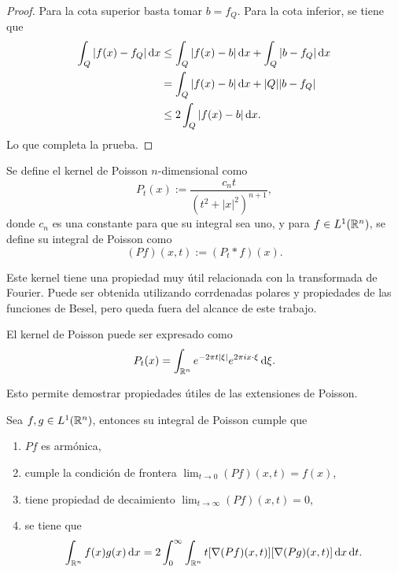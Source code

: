 \begin{proof}
	Para la cota superior basta tomar $b=f_Q$. Para la cota inferior, se tiene que
	\begin{align*}
		\int_Q |f(x) - f_Q|\mathop{}\!\mathrm{d} x & \leq \int_Q |f(x) - b| \mathop{}\!\mathrm{d} x + \int_Q |b- f_Q|\mathop{}\!\mathrm{d} x \\
		& =  \int_Q |f(x) - b| \mathop{}\!\mathrm{d} x + |Q||b-f_Q| \\
		& \leq 2 \int_Q |f(x) - b|\mathop{}\!\mathrm{d} x.
	\end{align*}
	Lo que completa la prueba.
\end{proof}
\begin{definition}
	Se define el kernel de Poisson  $n$-dimensional como 
	\begin{equation*}
		P_t(x) := \frac{c_nt}{(t^2+|x|^2)^{n+1}},
	\end{equation*}
	donde $c_n$ es una constante para que su integral sea uno, y para $f\in L^1(\mathbb{R}^n)$, se define su integral de Poisson como 
	\begin{equation*}
		(Pf)(x, t) := (P_t * f)(x).
	\end{equation*}
\end{definition}
Este kernel tiene una propiedad muy útil relacionada con la transformada de Fourier. Puede ser obtenida utilizando corrdenadas polares y propiedades de las funciones de Besel, pero queda fuera del alcance de este trabajo.
\begin{proposition}
	El kernel de Poisson puede ser expresado como
	\begin{equation*}
		P_t(x) = \int_{\mathbb{R}^n} e^{-2\pi t|\xi|} e^{2\pi i x\cdot\xi} \mathop{}\!\mathrm{d} \xi.
	\end{equation*}
\end{proposition}
Esto permite demostrar propiedades útiles de las extensiones de Poisson.
\begin{theorem}\label{theo:prop-Poisson}
	Sea $f,g\in L^1(\mathbb{R}^n)$, entonces su integral de Poisson cumple que
	\begin{enumerate}
		\item $Pf$ es armónica, 
		\item cumple la condición de frontera $\lim_{t\to0}(Pf)(x, t) = f(x)$,
		\item tiene propiedad de decaimiento $\lim_{t\to\infty}(Pf)(x, t) = 0$,
		\item se tiene que 
		\begin{equation*}
			\int_{\mathbb{R}^n} f(x)g(x)\mathop{}\!\mathrm{d} x =2 \int_0^\infty\int_{\mathbb{R}^n} t[\nabla(Pf)(x, t)][\nabla(Pg)(x, t)]\mathop{}\!\mathrm{d} x \mathop{}\!\mathrm{d} t.
		\end{equation*}
	\end{enumerate}
\end{theorem}
